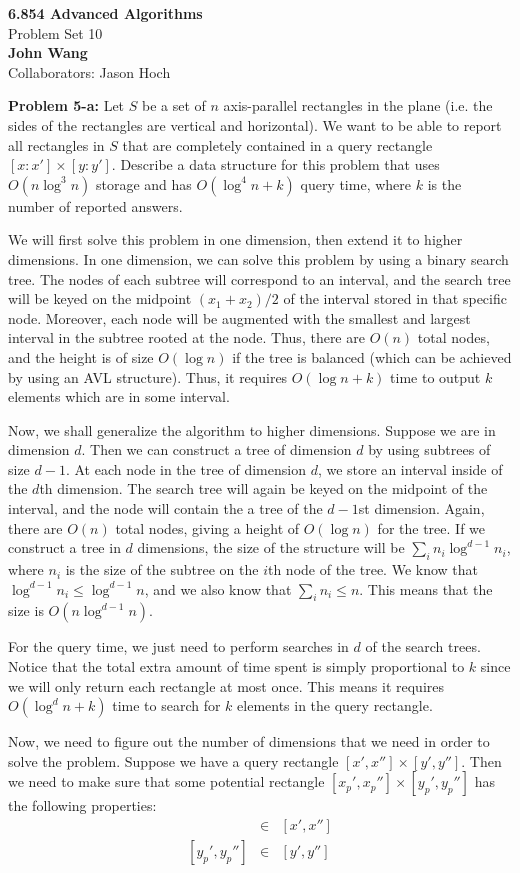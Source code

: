 \documentclass[psamsfonts]{amsart}
\newenvironment{sol}{\vspace{0.25cm}{\large \bfseries Solution:}}{\qedsymbol}
\newenvironment{prob}[1]{\begin{framed}{\large \bfseries Problem #1:}}{\end{framed}}
\newcommand{\makenewtitle}{
    \begin{center}
    {\huge \bfseries 6.854 Advanced Algorithms} \\
    Problem Set 10\\
    \vspace{0.25cm}
    {\bfseries John Wang} \\
    Collaborators: Jason Hoch 
    \end{center}
    \vspace{0.5cm}
}
\begin{document}
\newpage
\makenewtitle

\begin{prob}{5-a}
Let $S$ be a set of $n$ axis-parallel rectangles in the plane (i.e. the sides of the rectangles are vertical and horizontal). We want to be able to report all rectangles in $S$ that are completely contained in a query rectangle $[x: x'] \times [y : y']$. Describe a data structure for this problem that uses $O(n \log^3 n)$ storage and has $O(\log^4 n + k)$ query time, where $k$ is the number of reported answers.
\end{prob}
\begin{sol}
We will first solve this problem in one dimension, then extend it to higher dimensions. In one dimension, we can solve this problem by using a binary search tree. The nodes of each subtree will correspond to an interval, and the search tree will be keyed on the midpoint $(x_1 + x_2)/2$ of the interval stored in that specific node. Moreover, each node will be augmented with the smallest and largest interval in the subtree rooted at the node. Thus, there are $O(n)$ total nodes, and the height is of size $O(\log n)$ if the tree is balanced (which can be achieved by using an AVL structure). Thus, it requires $O(\log n + k)$ time to output $k$ elements which are in some interval. 

Now, we shall generalize the algorithm to higher dimensions. Suppose we are in dimension $d$. Then we can construct a tree of dimension $d$ by using subtrees of size $d-1$. At each node in the tree of dimension $d$, we store an interval inside of the $d$th dimension. The search tree will again be keyed on the midpoint of the interval, and the node will contain the a tree of the $d-1$st dimension. Again, there are $O(n)$ total nodes, giving a height of $O(\log n)$ for the tree. If we construct a tree in $d$ dimensions, the size of the structure will be $\sum_{i} n_i \log^{d-1} n_i$, where $n_i$ is the size of the subtree on the $i$th node of the tree. We know that $\log^{d-1} n_i \leq \log^{d-1} n$, and we also know that $\sum_{i} n_i \leq n$. This means that the size is $O(n \log^{d-1} n)$. 

For the query time, we just need to perform searches in $d$ of the search trees. Notice that the total extra amount of time spent is simply proportional to $k$ since we will only return each rectangle at most once. This means it requires $O(\log^d n + k)$ time to search for $k$ elements in the query rectangle. 

Now, we need to figure out the number of dimensions that we need in order to solve the problem. Suppose we have a query rectangle $[x', x''] \times [y', y'']$. Then we need to make sure that some potential rectangle $[x_p', x_p''] \times [y_p', y_p'']$ has the following properties:
\begin{eqnarray}
[x_p', x_p''] &\in& [x', x''] \\
\left[y_p', y_p'' \right] &\in& [y', y'']
\end{eqnarray}


\end{sol}
\end{document}
